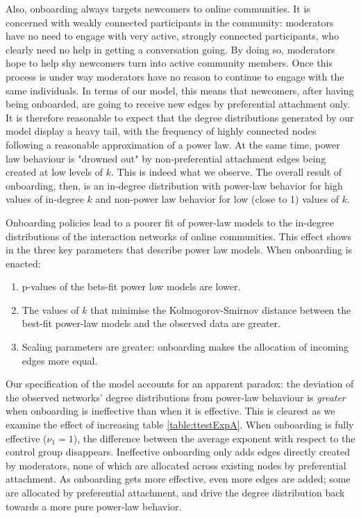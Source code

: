 \documentclass{article}
\begin{document}
Also, onboarding always targets newcomers to online communities. It is concerned with weakly connected participants in the community: moderators have no need to engage with very active, strongly connected participants, who clearly need no help in getting a conversation going. By doing so, moderators hope to help shy newcomers turn into active community members. Once this process is under way moderators have no reason to continue to engage with the same individuals. In terms of our model, this means that newcomers, after having being onboarded, are going to receive new edges by preferential attachment only. It is therefore reasonable to expect that the degree distributions generated by our model display a heavy tail, with the frequency of highly connected nodes following a reasonable approximation of a power law. At the same time, power law behaviour is "drowned out" by non-preferential attachment edges being created at low levels of $k$. This is indeed what we observe. The overall result of onboarding, then, is an in-degree distribution with power-law behavior for high values of in-degree $k$ and non-power law behavior for low (close to 1) values of $k$. 

Onboarding policies lead to a poorer fit of power-law models to the in-degree distributions of the interaction networks of online communities. This effect shows in the three key parameters that describe power law models. When onboarding is enacted:

\begin {enumerate}
\item p-values of the bets-fit power low models are lower. 
\item The values of $k$ that minimise the Kolmogorov-Smirnov distance between the best-fit power-law models and the observed data are greater. 
\item Scaling parameters are greater: onboarding makes the allocation of incoming edges more equal. 
\end{enumerate}

Our specification of the model accounts for an apparent paradox: the deviation of the observed networks' degree distributions from power-law behaviour is \emph{greater} when onboarding is ineffective than when it is effective. This is clearest as we examine the effect of increasing table \ref{table:ttestExpA}. When onboarding is fully effective ($\nu_1 = 1$), the difference between the average exponent with respect to the control group disappears. Ineffective onboarding only adds edges directly created by moderators, none of which are allocated across existing nodes by preferential attachment. As onboarding gets more effective, even more edges are added; some are allocated by preferential attachment, and drive the degree distribution back towards a more pure power-law behavior. 
\end{document}
